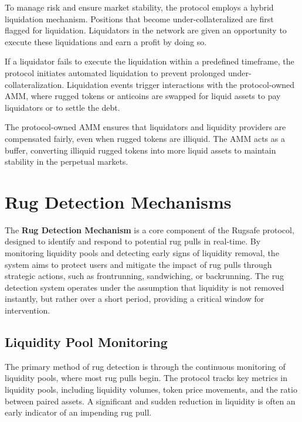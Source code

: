 \documentclass{article}
\begin{document}
To manage risk and ensure market stability, the protocol employs a hybrid liquidation mechanism. Positions that become under-collateralized are first flagged for liquidation. Liquidators in the network are given an opportunity to execute these liquidations and earn a profit by doing so. 

If a liquidator fails to execute the liquidation within a predefined timeframe, the protocol initiates automated liquidation to prevent prolonged under-collateralization. Liquidation events trigger interactions with the protocol-owned AMM, where rugged tokens or anticoins are swapped for liquid assets to pay liquidators or to settle the debt.

The protocol-owned AMM ensures that liquidators and liquidity providers are compensated fairly, even when rugged tokens are illiquid. The AMM acts as a buffer, converting illiquid rugged tokens into more liquid assets to maintain stability in the perpetual markets.










\section{Rug Detection Mechanisms}

The \textbf{Rug Detection Mechanism} is a core component of the Rugsafe protocol, designed to identify and respond to potential rug pulls in real-time. By monitoring liquidity pools and detecting early signs of liquidity removal, the system aims to protect users and mitigate the impact of rug pulls through strategic actions, such as frontrunning, sandwiching, or backrunning. The rug detection system operates under the assumption that liquidity is not removed instantly, but rather over a short period, providing a critical window for intervention.

\subsection{Liquidity Pool Monitoring}

The primary method of rug detection is through the continuous monitoring of liquidity pools, where most rug pulls begin. The protocol tracks key metrics in liquidity pools, including liquidity volumes, token price movements, and the ratio between paired assets. A significant and sudden reduction in liquidity is often an early indicator of an impending rug pull.
\end{document}

